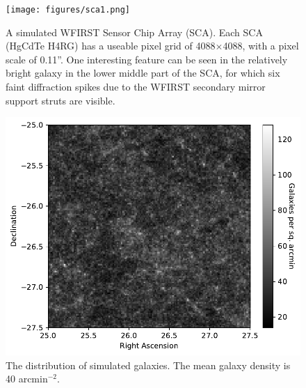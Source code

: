 \documentclass[aps,prd, amsmath,amssymb,superscriptaddress,showkeys,nofootinbib,reprint,preprintnumbers]{revtex4-1}
\begin{document}
\begin{figure}
\begin{center}
\texttt{[image: figures/sca1.png]}
\end{center}
\caption[]{
A simulated WFIRST Sensor Chip Array (SCA). Each SCA (HgCdTe H4RG) has a useable pixel grid of 4088$\times$4088, with a pixel scale of 0.11''. One interesting feature can be seen in the relatively bright galaxy in the lower middle part of the SCA, for which six faint diffraction spikes due to the WFIRST secondary mirror support struts are visible.
\label{fig:sca}}
\end{figure}

\begin{figure}
\begin{center}
\includegraphics[width=\columnwidth]{figures/galaxies.pdf}
\end{center}
\caption[]{
The distribution of simulated galaxies. The mean galaxy density is 40 arcmin$^{-2}$. 
\label{fig:galaxies}}
\end{figure}
\end{document}
